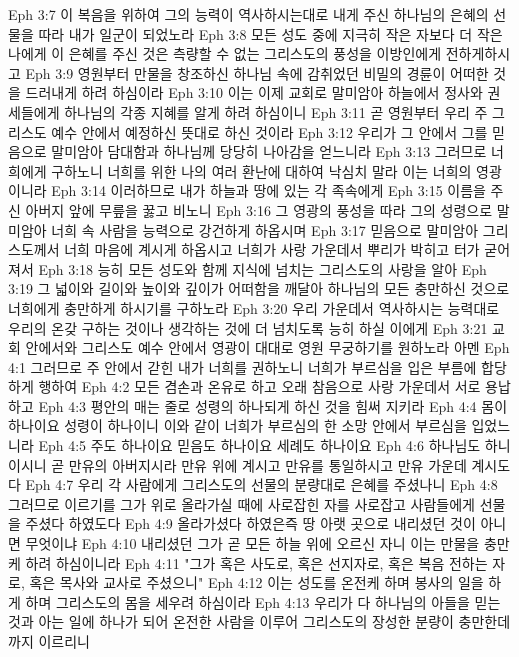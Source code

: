 Eph 3:7  이 복음을 위하여 그의 능력이 역사하시는대로 내게 주신 하나님의 은혜의 선물을 따라 내가 일군이 되었노라
Eph 3:8  모든 성도 중에 지극히 작은 자보다 더 작은 나에게 이 은혜를 주신 것은 측량할 수 없는 그리스도의 풍성을 이방인에게 전하게하시고
Eph 3:9  영원부터 만물을 창조하신 하나님 속에 감취었던 비밀의 경륜이 어떠한 것을 드러내게 하려 하심이라
Eph 3:10  이는 이제 교회로 말미암아 하늘에서 정사와 권세들에게 하나님의 각종 지혜를 알게 하려 하심이니
Eph 3:11  곧 영원부터 우리 주 그리스도 예수 안에서 예정하신 뜻대로 하신 것이라
Eph 3:12  우리가 그 안에서 그를 믿음으로 말미암아 담대함과 하나님께 당당히 나아감을 얻느니라
Eph 3:13  그러므로 너희에게 구하노니 너희를 위한 나의 여러 환난에 대하여 낙심치 말라 이는 너희의 영광이니라
Eph 3:14  이러하므로 내가 하늘과 땅에 있는 각 족속에게
Eph 3:15  이름을 주신 아버지 앞에 무릎을 꿇고 비노니
Eph 3:16  그 영광의 풍성을 따라 그의 성령으로 말미암아 너희 속 사람을 능력으로 강건하게 하옵시며
Eph 3:17  믿음으로 말미암아 그리스도께서 너희 마음에 계시게 하옵시고 너희가 사랑 가운데서 뿌리가 박히고 터가 굳어져서
Eph 3:18  능히 모든 성도와 함께 지식에 넘치는 그리스도의 사랑을 알아
Eph 3:19  그 넓이와 길이와 높이와 깊이가 어떠함을 깨달아 하나님의 모든 충만하신 것으로 너희에게 충만하게 하시기를 구하노라
Eph 3:20  우리 가운데서 역사하시는 능력대로 우리의 온갖 구하는 것이나 생각하는 것에 더 넘치도록 능히 하실 이에게
Eph 3:21  교회 안에서와 그리스도 예수 안에서 영광이 대대로 영원 무궁하기를 원하노라 아멘
Eph 4:1  그러므로 주 안에서 갇힌 내가 너희를 권하노니 너희가 부르심을 입은 부름에 합당하게 행하여
Eph 4:2  모든 겸손과 온유로 하고 오래 참음으로 사랑 가운데서 서로 용납하고
Eph 4:3  평안의 매는 줄로 성령의 하나되게 하신 것을 힘써 지키라
Eph 4:4  몸이 하나이요 성령이 하나이니 이와 같이 너희가 부르심의 한 소망 안에서 부르심을 입었느니라
Eph 4:5  주도 하나이요 믿음도 하나이요 세례도 하나이요
Eph 4:6  하나님도 하니이시니 곧 만유의 아버지시라 만유 위에 계시고 만유를 통일하시고 만유 가운데 계시도다
Eph 4:7  우리 각 사람에게 그리스도의 선물의 분량대로 은혜를 주셨나니
Eph 4:8  그러므로 이르기를 그가 위로 올라가실 때에 사로잡힌 자를 사로잡고 사람들에게 선물을 주셨다 하였도다
Eph 4:9  올라가셨다 하였은즉 땅 아랫 곳으로 내리셨던 것이 아니면 무엇이냐
Eph 4:10  내리셨던 그가 곧 모든 하늘 위에 오르신 자니 이는 만물을 충만케 하려 하심이니라
Eph 4:11  "그가 혹은 사도로, 혹은 선지자로, 혹은 복음 전하는 자로, 혹은 목사와 교사로 주셨으니"
Eph 4:12  이는 성도를 온전케 하며 봉사의 일을 하게 하며 그리스도의 몸을 세우려 하심이라
Eph 4:13  우리가 다 하나님의 아들을 믿는 것과 아는 일에 하나가 되어 온전한 사람을 이루어 그리스도의 장성한 분량이 충만한데까지 이르리니
